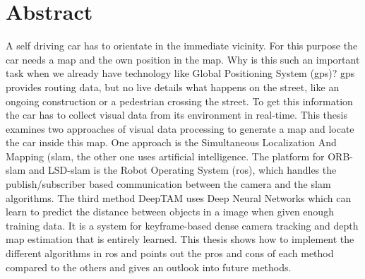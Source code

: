 

\chapter*{Abstract}
A self driving car has to orientate in the immediate vicinity. For this purpose the car needs a map and the own position in the map. Why is this such an important task when we already have technology like Global Positioning System (\gls{gps})? \gls{gps} provides routing data, but no live details what happens on the street, like an ongoing construction or a pedestrian crossing the street. To get this information the car has to collect visual data from its environment in real-time. This thesis examines two approaches of visual data processing to generate a map and locate the car inside this map. One approach is the Simultaneous Localization And Mapping (\gls{slam}, the other one uses artificial intelligence. The platform for ORB-\gls{slam} and LSD-\gls{slam} is the Robot Operating System (\gls{ros}), which handles the publish/subscriber based communication between the camera and the \gls{slam} algorithms. The third method DeepTAM uses Deep Neural Networks which can learn to predict the distance between objects in a image when given enough training data. It is a system for keyframe-based dense camera tracking and depth map estimation that is entirely learned. This thesis shows how to implement the different algorithms in \gls{ros} and points out the pros and cons of each method compared to the others and gives an outlook into future methods.
\newline
\newline
\newline
\newline
